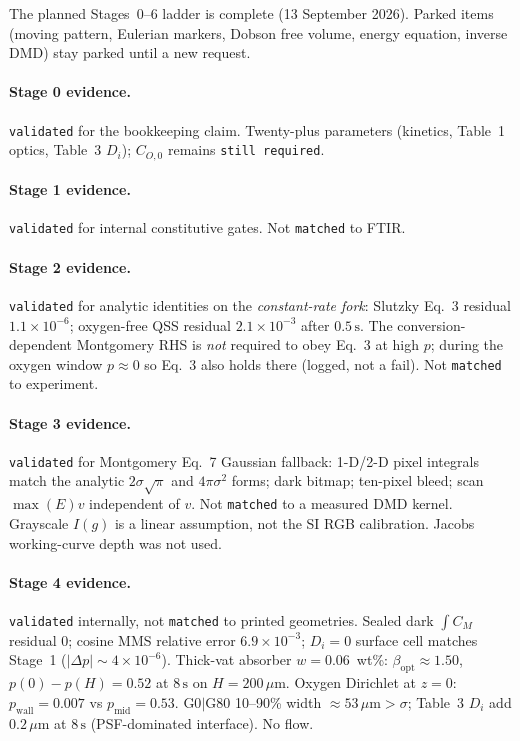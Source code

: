 \documentclass[11pt,a4paper]{article}
\newcommand{\tagmatch}{\texttt{matched}}
\newcommand{\stillreq}{\texttt{still required}}
\begin{document}
The planned Stages~0--6 ladder is complete (13 September 2026).
Parked items (moving pattern, Eulerian markers, Dobson free volume, energy equation, inverse DMD) stay parked until a new request.

\paragraph{Stage 0 evidence.}
\texttt{validated} for the bookkeeping claim.
Twenty-plus parameters (kinetics, Table~1 optics, Table~3 $D_i$); $C_{O,0}$ remains \stillreq.

\paragraph{Stage 1 evidence.}
\texttt{validated} for internal constitutive gates.
Not \tagmatch{} to FTIR.

\paragraph{Stage 2 evidence.}
\texttt{validated} for analytic identities on the \emph{constant-rate fork}:
Slutzky Eq.~3 residual $1.1\times 10^{-6}$; oxygen-free QSS residual $2.1\times 10^{-3}$ after $0.5\,\mathrm{s}$.
The conversion-dependent Montgomery RHS is \emph{not} required to obey Eq.~3 at high $p$; during the oxygen window $p\approx 0$ so Eq.~3 also holds there (logged, not a fail).
Not \tagmatch{} to experiment.

\paragraph{Stage 3 evidence.}
\texttt{validated} for Montgomery Eq.~7 Gaussian fallback: 1-D/2-D pixel integrals match the analytic $2\sigma\sqrt{\pi}$ and $4\pi\sigma^2$ forms; dark bitmap; ten-pixel bleed; scan $\max(E)v$ independent of $v$.
Not \tagmatch{} to a measured DMD kernel. Grayscale $I(g)$ is a linear assumption, not the SI RGB calibration.
Jacobs working-curve depth was not used.

\paragraph{Stage 4 evidence.}
\texttt{validated} internally, not \tagmatch{} to printed geometries.
Sealed dark $\int C_M$ residual $0$; cosine MMS relative error $6.9\times 10^{-3}$; $D_i=0$ surface cell matches Stage~1 ($|\Delta p|\sim 4\times 10^{-6}$).
Thick-vat absorber $w=0.06$~wt\%: $\beta_{\mathrm{opt}}\approx 1.50$, $p(0)-p(H)=0.52$ at $8\,\mathrm{s}$ on $H=200\,\mu\mathrm{m}$.
Oxygen Dirichlet at $z=0$: $p_{\mathrm{wall}}=0.007$ vs $p_{\mathrm{mid}}=0.53$.
G0$|$G80 10--90\% width $\approx 53\,\mu\mathrm{m}>\sigma$; Table~3 $D_i$ add $0.2\,\mu\mathrm{m}$ at $8\,\mathrm{s}$ (PSF-dominated interface).
No flow.
\end{document}

